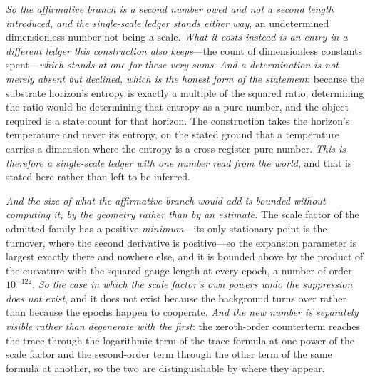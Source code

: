 \documentclass[11pt,a4paper]{article}
\theoremstyle{plain}
\theoremstyle{definition}
\theoremstyle{remark}
\begin{document}
\emph{So the affirmative branch is a second number owed and not a second length introduced, and the
single-scale ledger stands either way}, an undetermined dimensionless number not being a scale. \emph{What
it costs instead is an entry in a different ledger this construction also keeps}---the count of
dimensionless constants spent---\emph{which stands at one for these very sums}. \emph{And a determination
is not merely absent but declined, which is the honest form of the statement}: because the substrate
horizon's entropy is exactly a multiple of the squared ratio, determining the ratio would be determining
that entropy as a pure number, and the object required is a state count for that horizon. The construction
takes the horizon's temperature and never its entropy, on the stated ground that a temperature carries a
dimension where the entropy is a cross-register pure number. \emph{This is therefore a single-scale ledger
with one number read from the world}, and that is stated here rather than left to be inferred.

\emph{And the size of what the affirmative branch would add is bounded without computing it, by the
geometry rather than by an estimate.} The scale factor of the admitted family has a positive
\emph{minimum}---its only stationary point is the turnover, where the second derivative is positive---so
the expansion parameter is largest exactly there and nowhere else, and it is bounded above by the product
of the curvature with the squared gauge length at every epoch, a number of order $10^{-122}$. \emph{So the
case in which the scale factor's own powers undo the suppression does not exist}, and it does not exist
because the background turns over rather than because the epochs happen to
cooperate.
\emph{And the new number is separately visible rather than degenerate with the first}: the zeroth-order
counterterm reaches the trace through the logarithmic term of the trace formula at one power of the scale
factor and the second-order term through the other term of the same formula at another, so the two are
distinguishable by where they appear.
\end{document}
